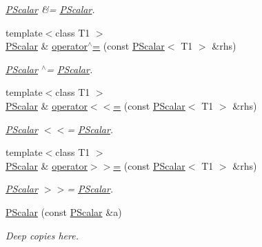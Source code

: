 \begin{DoxyCompactItemize}
\begin{DoxyCompactList}\small\item\em \mbox{\hyperlink{classENSEM_1_1PScalar}{P\+Scalar}} \&= \mbox{\hyperlink{classENSEM_1_1PScalar}{P\+Scalar}}. \end{DoxyCompactList}\item 
{\footnotesize template$<$class T1 $>$ }\\\mbox{\hyperlink{classENSEM_1_1PScalar}{P\+Scalar}} \& \mbox{\hyperlink{classENSEM_1_1PScalar_a3f256371cc925f01209559addfcbb632}{operator$^\wedge$=}} (const \mbox{\hyperlink{classENSEM_1_1PScalar}{P\+Scalar}}$<$ T1 $>$ \&rhs)
\begin{DoxyCompactList}\small\item\em \mbox{\hyperlink{classENSEM_1_1PScalar}{P\+Scalar}} $^\wedge$= \mbox{\hyperlink{classENSEM_1_1PScalar}{P\+Scalar}}. \end{DoxyCompactList}\item 
{\footnotesize template$<$class T1 $>$ }\\\mbox{\hyperlink{classENSEM_1_1PScalar}{P\+Scalar}} \& \mbox{\hyperlink{classENSEM_1_1PScalar_ade643675ab6ef041676e1098ac740b29}{operator$<$$<$=}} (const \mbox{\hyperlink{classENSEM_1_1PScalar}{P\+Scalar}}$<$ T1 $>$ \&rhs)
\begin{DoxyCompactList}\small\item\em \mbox{\hyperlink{classENSEM_1_1PScalar}{P\+Scalar}} $<$$<$= \mbox{\hyperlink{classENSEM_1_1PScalar}{P\+Scalar}}. \end{DoxyCompactList}\item 
{\footnotesize template$<$class T1 $>$ }\\\mbox{\hyperlink{classENSEM_1_1PScalar}{P\+Scalar}} \& \mbox{\hyperlink{classENSEM_1_1PScalar_a8fe07cd0462ddff9e3d0858ebe29e77c}{operator$>$$>$=}} (const \mbox{\hyperlink{classENSEM_1_1PScalar}{P\+Scalar}}$<$ T1 $>$ \&rhs)
\begin{DoxyCompactList}\small\item\em \mbox{\hyperlink{classENSEM_1_1PScalar}{P\+Scalar}} $>$$>$= \mbox{\hyperlink{classENSEM_1_1PScalar}{P\+Scalar}}. \end{DoxyCompactList}\item 
\mbox{\hyperlink{classENSEM_1_1PScalar_a2bf292f92c6654475bf2bc93c48adcd1}{P\+Scalar}} (const \mbox{\hyperlink{classENSEM_1_1PScalar}{P\+Scalar}} \&a)
\begin{DoxyCompactList}\small\item\em Deep copies here. \end{DoxyCompactList}\item 

\end{DoxyCompactItemize}
